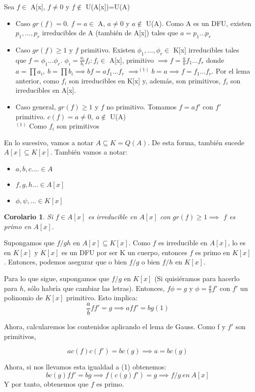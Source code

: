\documentclass[11pt, a4paper, titlepage]{article}
\makeatletter
\renewenvironment{proof}[1][\proofname] {\vspace{-15pt}\par\pushQED{\qed}\normalfont\topsep6\p@\@plus6\p@\relax\trivlist\item[\hskip\labelsep\it#1\@addpunct{.}]\ignorespaces}{\popQED\endtrivlist\@endpefalse}
\theoremstyle{theorem-style}
\newtheorem{ncor}{Corolario}
\theoremstyle{definition-style}
\theoremstyle{remark-style}
\theoremstyle{example-style}
\makeatother
\begin{document}
\begin{proof}
Sea $f \in$ A[x], $f \neq 0$ y $f \notin$ U(A[x])=U(A)
\begin{itemize}
	\item Caso $gr(f) = 0$. $f = a \in$ A, $a \neq 0$ y $a \notin$ U(A). Como A es un DFU, existen $p_1,...,p_r$ irreducibles de A (también de A[x]) tales que $a = p_1...p_r$
	\item Caso $gr(f) \geq 1$ y $f$ primitivo. Existen $\phi_1,...,\phi_r \in$ K[x] irreducibles tales que $f=\phi_1...\phi_r$. $\phi_i = \frac{a_i}{b_i}f_i : f_i \in$ A[x], primitivo $\implies f = \frac{a}{b}f_1...f_r$ donde $a=\prod a_i,\ b=\prod b_i \implies bf = af_1...f_r$ $\implies^{(1)} b=a \implies f = f_1...f_r$. Por el lema anterior, como $f_i$ son irreducibles en K[x] y, además, son primitivos, $f_i$ son irreducibles en A[x].
	\item Caso general, $gr(f) \geq 1$ y $f$ no primitivo. Tomamos $f=af'$
con $f'$ primitivo. $c(f) = a \neq 0,\ a \notin$ U(A)\\
$^{(1)}$ Como $f_i$ son primitivos
\end{itemize} 
\end{proof}


En lo sucesivo, vamos a notar $A\subseteq K = Q(A)$. De esta forma, también sucede $A[x] \subseteq K[x]$. También vamos a notar:
\begin{itemize}
	\item $a,b,c.... \in A$
	\item $f,g,h... \in A[x]$
	\item $\phi,\psi, ... \in K[x]$
\end{itemize}

\begin{ncor}
	Si $f\in A[x]$ es irreducible en $A[x]$ con $gr(f) \geq 1\implies$ $f$ es primo en $A[x]$.
\end{ncor}
\begin{proof}
	Supongamos que $f/gh$ en $A[x]\subseteq K[x]$. Como $f$ es irreducible en $A[x]$, lo  es en $K[x]$ y $K[x]$ es un DFU por ser K un cuerpo, entonces $f$ es primo en $K[x]$. Entonces, podemos asegurar que o bien $f/g$ o bien $f/h$ en $K[x]$.
	
	Para lo que sigue, supongamos que $f/g$ en $K[x]$ (Si quisiéramos para hacerlo para $h$, sólo habría que cambiar las letras). Entonces, $f\phi = g $ y $\phi = \frac{a}{b}f'$ con $f'$ un polinomio de $K[x]$ primitivo. Esto implica: $$\frac{a}{b}ff'=g \implies aff' = bg(1)$$
	
	Ahora, calcularemos los contenidos aplicando el lema de Gauss. Como f y $f'$ son primitivos,
	
	$$ a c(f)c(f') = bc(g) \implies a = bc(g)$$
	
	Ahora, si nos llevamos esta igualdad a (1) obtenemos:
	\[
	bc(g)ff'=bg \implies f(c(g)f')=g \implies f/g \ en \ A[x]
	\]
	Y por tanto, obtenemos que $f$ es primo.
\end{proof}
\end{document}
